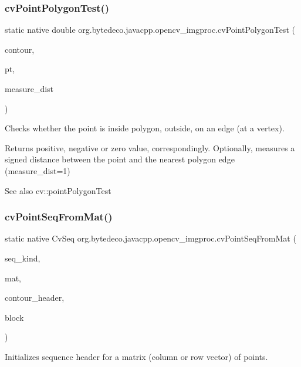 \subsubsection{\texorpdfstring{cv\+Point\+Polygon\+Test()}{cvPointPolygonTest()}}
{\footnotesize\ttfamily static native double org.\+bytedeco.\+javacpp.\+opencv\+\_\+imgproc.\+cv\+Point\+Polygon\+Test (\begin{DoxyParamCaption}\item[{@Const Cv\+Arr}]{contour,  }\item[{@By\+Val Cv\+Point2\+D32f}]{pt,  }\item[{int}]{measure\+\_\+dist }\end{DoxyParamCaption})\hspace{0.3cm}{\ttfamily [static]}}



Checks whether the point is inside polygon, outside, on an edge (at a vertex). 

Returns positive, negative or zero value, correspondingly. Optionally, measures a signed distance between the point and the nearest polygon edge (measure\+\_\+dist=1) \begin{DoxySeeAlso}{See also}
cv\+::point\+Polygon\+Test 
\end{DoxySeeAlso}
\mbox{\label{group__imgproc__c_ga75ebb68fece47bfb144af0ad2a86668e}} 
\subsubsection{\texorpdfstring{cv\+Point\+Seq\+From\+Mat()}{cvPointSeqFromMat()}}
{\footnotesize\ttfamily static native Cv\+Seq org.\+bytedeco.\+javacpp.\+opencv\+\_\+imgproc.\+cv\+Point\+Seq\+From\+Mat (\begin{DoxyParamCaption}\item[{int}]{seq\+\_\+kind,  }\item[{@Const Cv\+Arr}]{mat,  }\item[{Cv\+Contour}]{contour\+\_\+header,  }\item[{Cv\+Seq\+Block}]{block }\end{DoxyParamCaption})\hspace{0.3cm}{\ttfamily [static]}}



Initializes sequence header for a matrix (column or row vector) of points. 

